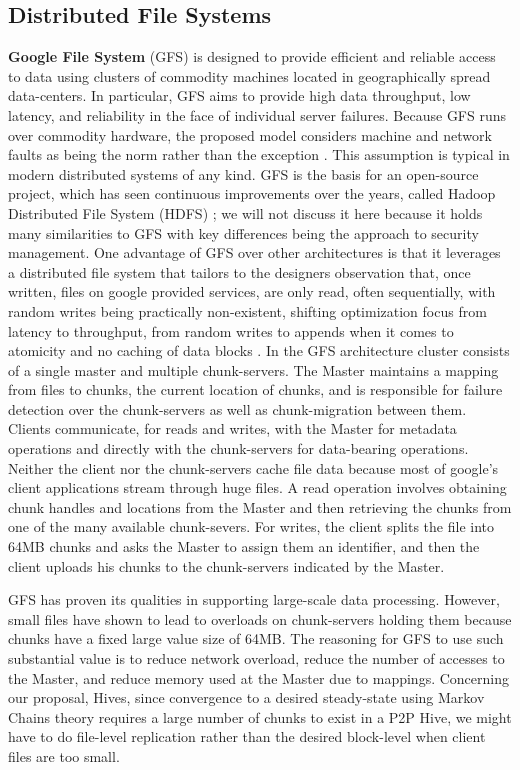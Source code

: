 \documentclass[runningheads]{llncs}
\begin{document}
\subsection{Distributed File Systems}
\textbf{Google File System} (GFS) is designed to provide efficient and reliable access to data using clusters of commodity machines located in geographically spread data-centers. In particular, GFS aims to provide high data throughput, low latency, and reliability in the face of individual server failures. Because GFS runs over commodity hardware, the proposed model considers machine and network faults as being the norm rather than the exception \cite{gfs}.  This assumption is typical in modern distributed systems of any kind. GFS is the basis for an open-source project, which has seen continuous improvements over the years, called Hadoop Distributed File System (HDFS) \cite{hadoop}; we will not discuss it here because it holds many similarities to GFS with key differences being the approach to security management. One advantage of GFS over other architectures is that it leverages a distributed file system that tailors to the designers observation that, once written, files on google provided services, are only read, often sequentially, with random writes being practically non-existent, shifting optimization focus from latency to throughput, from random writes to appends when it comes to atomicity and no caching of data blocks \cite{gfs}. In the GFS architecture cluster consists of a single master and multiple chunk-servers. The Master maintains a mapping from files to chunks, the current location of chunks, and is responsible for failure detection over the chunk-servers as well as chunk-migration between them. Clients communicate, for reads and writes, with the Master for metadata operations and directly with the chunk-servers for data-bearing operations. Neither the client nor the chunk-servers cache file data because most of google's client applications stream through huge files. A read operation involves obtaining chunk handles and locations from the Master and then retrieving the chunks from one of the many available chunk-severs. For writes, the client splits the file into 64MB chunks and asks the Master to assign them an identifier, and then the client uploads his chunks to the chunk-servers indicated by the Master.

GFS has proven its qualities in supporting large-scale data processing. However, small files have shown \cite{gfs} to lead to overloads on chunk-servers holding them because chunks have a fixed large value size of 64MB. The reasoning for GFS to use such substantial value is to reduce network overload, reduce the number of accesses to the Master, and reduce memory used at the Master due to mappings. Concerning our proposal, Hives, since convergence to a desired steady-state using Markov Chains theory requires a large number of chunks to exist in a P2P Hive, we might have to do file-level replication rather than the desired block-level when client files are too small.\newline
\end{document}
